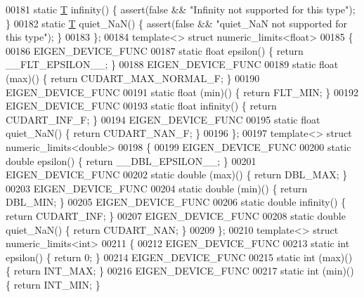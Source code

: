 \begin{DoxyCode}
00181   \textcolor{keyword}{static} \hyperlink{group___sparse_core___module_class_eigen_1_1_triplet}{T} infinity() \{ assert(\textcolor{keyword}{false} && \textcolor{stringliteral}{"Infinity not supported for this type"}); \}
00182   \textcolor{keyword}{static} \hyperlink{group___sparse_core___module_class_eigen_1_1_triplet}{T} quiet\_NaN() \{ assert(\textcolor{keyword}{false} && \textcolor{stringliteral}{"quiet\_NaN not supported for this type"}); \}
00183 \};
00184 \textcolor{keyword}{template}<> \textcolor{keyword}{struct }numeric\_limits<float>
00185 \{
00186   EIGEN\_DEVICE\_FUNC
00187   \textcolor{keyword}{static} \textcolor{keywordtype}{float} epsilon() \{ \textcolor{keywordflow}{return} \_\_FLT\_EPSILON\_\_; \}
00188   EIGEN\_DEVICE\_FUNC
00189   \textcolor{keyword}{static} float (max)() \{ \textcolor{keywordflow}{return} CUDART\_MAX\_NORMAL\_F; \}
00190   EIGEN\_DEVICE\_FUNC
00191   \textcolor{keyword}{static} float (min)() \{ \textcolor{keywordflow}{return} FLT\_MIN; \}
00192   EIGEN\_DEVICE\_FUNC
00193   \textcolor{keyword}{static} \textcolor{keywordtype}{float} infinity() \{ \textcolor{keywordflow}{return} CUDART\_INF\_F; \}
00194   EIGEN\_DEVICE\_FUNC
00195   \textcolor{keyword}{static} \textcolor{keywordtype}{float} quiet\_NaN() \{ \textcolor{keywordflow}{return} CUDART\_NAN\_F; \}
00196 \};
00197 \textcolor{keyword}{template}<> \textcolor{keyword}{struct }numeric\_limits<double>
00198 \{
00199   EIGEN\_DEVICE\_FUNC
00200   \textcolor{keyword}{static} \textcolor{keywordtype}{double} epsilon() \{ \textcolor{keywordflow}{return} \_\_DBL\_EPSILON\_\_; \}
00201   EIGEN\_DEVICE\_FUNC
00202   \textcolor{keyword}{static} double (max)() \{ \textcolor{keywordflow}{return} DBL\_MAX; \}
00203   EIGEN\_DEVICE\_FUNC
00204   \textcolor{keyword}{static} double (min)() \{ \textcolor{keywordflow}{return} DBL\_MIN; \}
00205   EIGEN\_DEVICE\_FUNC
00206   \textcolor{keyword}{static} \textcolor{keywordtype}{double} infinity() \{ \textcolor{keywordflow}{return} CUDART\_INF; \}
00207   EIGEN\_DEVICE\_FUNC
00208   \textcolor{keyword}{static} \textcolor{keywordtype}{double} quiet\_NaN() \{ \textcolor{keywordflow}{return} CUDART\_NAN; \}
00209 \};
00210 \textcolor{keyword}{template}<> \textcolor{keyword}{struct }numeric\_limits<int>
00211 \{
00212   EIGEN\_DEVICE\_FUNC
00213   \textcolor{keyword}{static} \textcolor{keywordtype}{int} epsilon() \{ \textcolor{keywordflow}{return} 0; \}
00214   EIGEN\_DEVICE\_FUNC
00215   \textcolor{keyword}{static} int (max)() \{ \textcolor{keywordflow}{return} INT\_MAX; \}
00216   EIGEN\_DEVICE\_FUNC
00217   \textcolor{keyword}{static} int (min)() \{ \textcolor{keywordflow}{return} INT\_MIN; \}

\end{DoxyCode}
